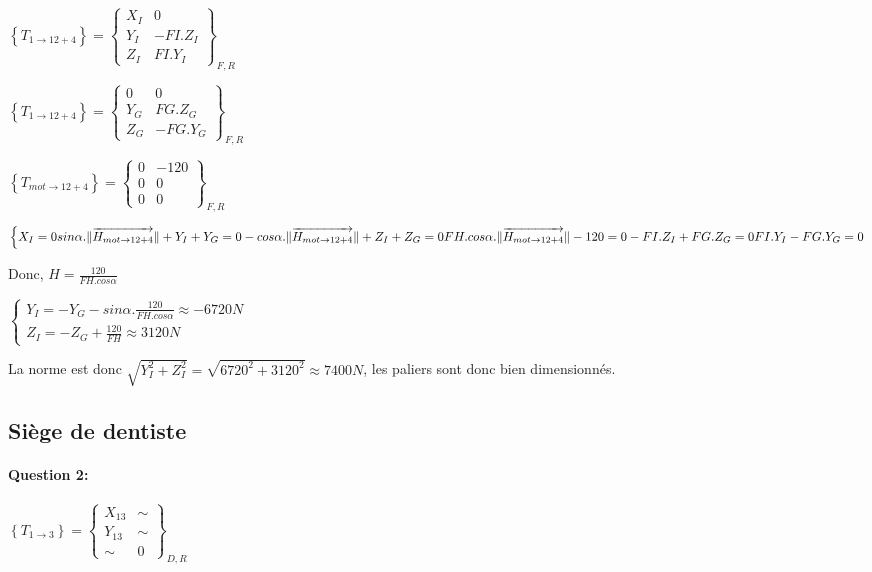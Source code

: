 $\left\{T_{1\rightarrow 12+4}\right\}=\left\{
\begin{array}{cc}
X_I & 0 \\
Y_I & -FI.Z_I \\
Z_I & FI.Y_I
\end{array}
\right\}_{F,R}$

$\left\{T_{1\rightarrow 12+4}\right\}=\left\{
\begin{array}{cc}
0 & 0 \\
Y_G & FG.Z_G \\
Z_G & -FG.Y_G
\end{array}
\right\}_{F,R}$

$\left\{T_{mot\rightarrow 12+4}\right\}=\left\{
\begin{array}{cc}
0 & -120 \\
0 & 0 \\
0 & 0
\end{array}
\right\}_{F,R}$


$\left\{
X_I=0 \\
sin\alpha.\|\overrightarrow{H_{mot\rightarrow 12+4}}\|+Y_I+Y_G=0 \\
-cos\alpha.\|\overrightarrow{H_{mot\rightarrow 12+4}}\|+Z_I+Z_G=0 \\
FH.cos\alpha.\|\overrightarrow{H_{mot\rightarrow 12+4}}\|-120=0 \\
-FI.Z_I+FG.Z_G=0 \\
FI.Y_I-FG.Y_G=0
\right.$

Donc, $H=\frac{120}{FH.cos\alpha}$

$\left\{\begin{array}{l}
Y_I=-Y_G-sin\alpha.\frac{120}{FH.cos\alpha}\approx -6720N \\
Z_I=-Z_G+\frac{120}{FH}\approx 3120N
\end{array}\right.$

La norme est donc $\sqrt{Y_I^2+Z_I^2}=\sqrt{6720^2+3120^2}\approx 7400N$, les paliers sont donc bien dimensionnés.

\subsection{Siège de dentiste}

\paragraph{Question 2:}

$\left\{T_{1\rightarrow 3}\right\}=\left\{
\begin{array}{cc}
X_{13} & \sim \\
Y_{13} & \sim \\
\sim & 0
\end{array}
\right\}_{D,R}$

